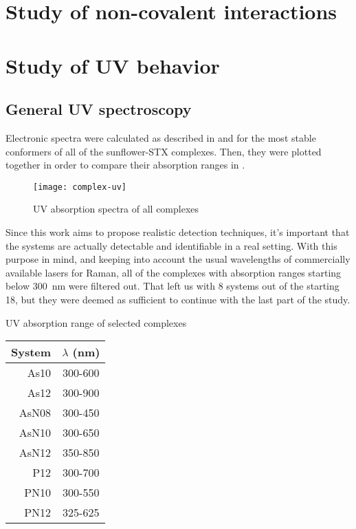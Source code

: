 \section{Study of non-covalent interactions}
\blindtext[2]

\section{Study of UV behavior}
\blindtext
\subsection{General UV spectroscopy}

Electronic spectra were calculated as described in  and  for the most stable conformers of all of the sunflower-STX complexes.
Then, they were plotted together in order to compare their absorption ranges in .

 \blindtext

\begin{figure*}
    \texttt{[image: complex-uv]}
    \caption[UV absorption spectra of all complexes]{UV absorption spectra of all complexes}
\end{figure*}

Since this work aims to propose realistic detection techniques, it's important that the systems are actually detectable and identifiable in a real setting.
With this purpose in mind, and keeping into account the usual wavelengths of commercially available lasers for Raman, all of the complexes with absorption ranges starting below \SI{300}{\nano\metre} were filtered out.
That left us with 8 systems out of the starting 18, but they were deemed as sufficient to continue with the last part of the study.

\begin{margintable}
    \centering
    \caption[UV absorption range of selected complexes]{UV absorption range of selected complexes}
    \begin{tabular}{@{}rc@{}}
        \toprule
        System & $\lambda$ (\si{\nano\metre}) \\
        \midrule
        As10 & 300-600 \\
        As12 & 300-900 \\
        AsN08 & 300-450 \\
        AsN10 & 300-650 \\
        AsN12 & 350-850 \\
        P12 & 300-700 \\
        PN10 & 300-550 \\
        PN12 & 325-625 \\
    \end{tabular}
\end{margintable}

